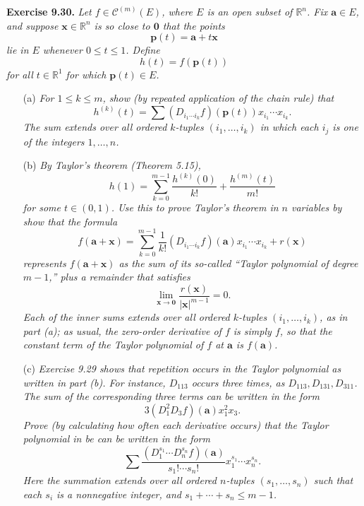 \documentclass{article}
\begin{document}
\textbf{Exercise 9.30.}
\emph{Let $f \in \mathscr{C}^{(m)}(E)$, where $E$ is an open subset of $\mathbb{R}^n$.
Fix $\mathbf{a} \in E$,
and suppose $\mathbf{x} \in \mathbb{R}^n$ is so close to $\mathbf{0}$ that the points
\[
 \mathbf{p}(t) = \mathbf{a} + t \mathbf{x}
\]
lie in $E$ whenever $0 \leq t \leq 1$.
Define
\[
  h(t) = f(\mathbf{p}(t))
\]
for all $t \in \mathbb{R}^1$ for which $\mathbf{p}(t) \in E$.}
\begin{enumerate}
\item[(a)]
  \emph{For $1 \leq k \leq m$, show (by repeated application of the chain rule) that
  \[
    h^{(k)}(t) = \sum (D_{i_1 \cdots i_k}f)(\mathbf{p}(t)) x_{i_1} \cdots x_{i_k}.
  \]
  The sum extends over all ordered $k$-tuples
  $(i_1,\ldots,i_k)$
  in which each $i_j$ is one of the integers $1,\ldots,n$.}

\item[(b)]
  \emph{By Taylor's theorem (Theorem 5.15),
  \[
    h(1) = \sum_{k=0}^{m-1} \frac{h^{(k)}(0)}{k!} + \frac{h^{(m)}(t)}{m!}
  \]
  for some $t \in (0,1)$.
  Use this to prove Taylor's theorem in $n$ variables by show that the formula
  \[
    f(\mathbf{a} + \mathbf{x})
    = \sum_{k=0}^{m-1} \frac{1}{k!}(D_{i_1 \cdots i_k}f)(\mathbf{a})x_{i_1} \cdots x_{i_k}
     + r(\mathbf{x})
  \]
  represents $f(\mathbf{a} + \mathbf{x})$ as the sum of its so-called
  ``Taylor polynomial of degree $m-1$,''
  plus a remainder that satisfies
  \[
    \lim_{\mathbf{x} \to \mathbf{0}} \frac{r(\mathbf{x})}{|\mathbf{x}|^{m-1}} = 0.
  \]
  Each of the inner sums extends over all ordered $k$-tuples
  $(i_1,\ldots,i_k)$, as in part (a);
  as usual, the zero-order derivative of $f$ is simply $f$,
  so that the constant term of the Taylor polynomial of $f$ at $\mathbf{a}$ is
  $f(\mathbf{a})$.}

\item[(c)]
  \emph{Exercise 9.29 shows that repetition occurs in the Taylor polynomial
  as written in part (b).
  For instance, $D_{113}$ occurs three times, as $D_{113}, D_{131}, D_{311}$.
  The sum of the corresponding three terms can be written in the form
  \[
    3 (D_1^2 D_3 f)(\mathbf{a})x_1^2 x_3.
  \]
  Prove (by calculating how often each derivative occurs) that the Taylor polynomial
  in be can be written in the form
  \[
    \sum \frac{(D_1^{s_1} \cdots D_n^{s_n}f)(\mathbf{a})}{s_1! \cdots s_n!}
      x_1^{s_1} \cdots x_n^{s_n}.
  \]
  Here the summation extends over all ordered $n$-tuples $(s_1,\ldots,s_n)$
  such that each $s_i$ is a nonnegative integer, and $s_1 + \cdots + s_n \leq m-1$.} \\
\end{enumerate}
\end{document}
